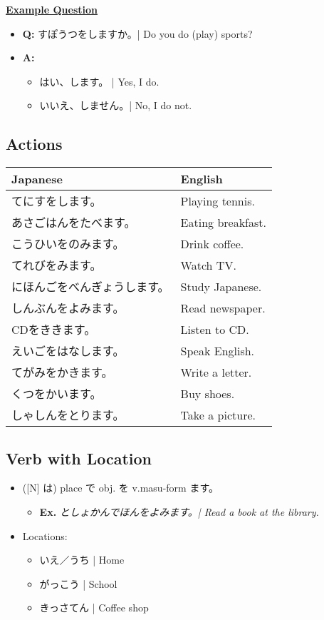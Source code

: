 \documentclass{article}
\begin{document}
\begin{CJK}{UTF8}{min}
\clearpage

\underline{\bf Example Question}

\begin{itemize}
\item {\bf Q:} すぽうつをしますか。| Do you do (play) sports?
\item {\bf A:}
\begin{itemize}
\item はい、します。 | Yes, I do.
\item いいえ、しません。| No, I do not.
\end{itemize}
\end{itemize}

\subsection{Actions}

\begin{tabular}{ l | l }
Japanese & English\\
\hline
てにすをします。 & Playing tennis.\\
あさごはんをたべます。 & Eating breakfast.\\
こうひいをのみます。 & Drink coffee.\\
てれびをみます。 & Watch TV.\\
にほんごをべんぎょうします。 & Study Japanese.\\
しんぶんをよみます。 & Read newspaper.\\
CDをききます。& Listen to CD.\\
えいごをはなします。 & Speak English.\\
てがみをかきます。 & Write a letter.\\
くつをかいます。 & Buy shoes.\\
しゃしんをとります。 & Take a picture.\\
\end{tabular}

\subsection{Verb with Location}

\begin{itemize}
\item ([N] は) place で obj. を v.masu-form ます。
\begin{itemize}
\item {\bf Ex.} {\it としょかんでほんをよみます。| Read a book at the library.}
\end{itemize}
\item Locations:
\begin{itemize}
\item いえ／うち | Home
\item がっこう | School
\item きっさてん | Coffee shop
\end{itemize}
\end{itemize}


\end{CJK}
\end{document}

